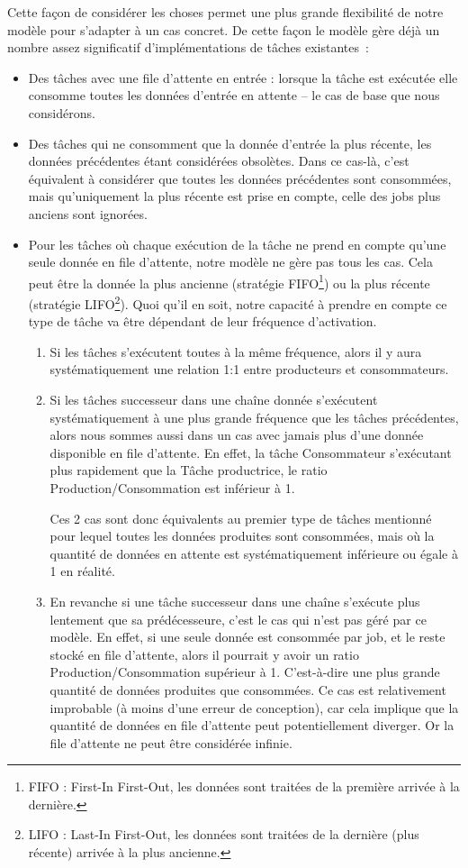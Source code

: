 \documentclass[french, a4paper, 11pt, twoside, pdftex]{StyleThese}
\begin{document}
  		 Cette façon de considérer les choses permet une plus grande flexibilité de notre modèle pour s'adapter à un cas concret. De cette façon le modèle gère déjà un nombre assez significatif d'implémentations de tâches existantes~:
	\begin{itemize}
		\item   		Des tâches avec une file d'attente en entrée : lorsque la tâche est exécutée elle consomme toutes les données d'entrée en attente -- le cas de base que nous considérons.
		\item   		Des tâches qui ne consomment que la donnée d'entrée la plus récente, les données précédentes étant considérées obsolètes. Dans ce cas-là, c'est équivalent à considérer que toutes les données précédentes sont consommées, mais qu'uniquement la plus récente est prise en compte, celle des jobs plus anciens sont ignorées.
		\item   		Pour les tâches où chaque exécution de la tâche ne prend en compte qu'une seule donnée en file d'attente, notre modèle ne gère pas tous les cas. Cela peut être la donnée la plus ancienne (stratégie FIFO\footnote{FIFO : First-In First-Out, les données sont traitées de la première arrivée à la dernière.}) ou la plus récente (stratégie LIFO\footnote{LIFO : Last-In First-Out, les données sont traitées de la dernière (plus récente) arrivée à la plus ancienne.}). Quoi qu'il en soit, notre capacité à prendre en compte ce type de tâche va être dépendant de leur fréquence d'activation. 
		\begin{enumerate}
			\item 	Si les tâches s'exécutent toutes à la même fréquence, alors il y aura systématiquement une relation 1\string:1 entre producteurs et consommateurs.
			\item 	Si les tâches successeur dans une chaîne donnée s'exécutent systématiquement à une plus grande fréquence que les tâches précédentes, alors nous sommes aussi dans un cas avec jamais plus d'une donnée disponible en file d'attente. En effet, la tâche Consommateur s'exécutant plus rapidement que la Tâche productrice, le ratio Production/Consommation est inférieur à 1.
		
		Ces 2 cas sont donc équivalents au premier type de tâches mentionné pour lequel toutes les données produites sont consommées, mais où la quantité de données en attente est systématiquement inférieure ou égale à 1 en réalité.
			\item 	En revanche si une tâche successeur dans une chaîne s'exécute plus lentement que sa prédécesseure, c'est le cas qui n'est pas géré par ce modèle. En effet, si une seule donnée est consommée par job, et le reste stocké en file d'attente, alors il pourrait y avoir un ratio Production/Consommation supérieur à 1. C'est-à-dire une plus grande quantité de données produites que consommées. Ce cas est relativement improbable (à moins d'une erreur de conception), car cela implique que la quantité de données en file d'attente peut potentiellement diverger. Or la file d'attente ne peut être considérée infinie.
		\end{enumerate}  
	\end{itemize}
\end{document}
